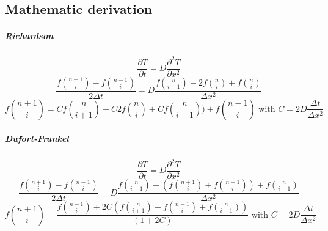 \documentclass[12pt, a4paper]{report}
\begin{document}
\begin{appendix}
\clearpage
{}
\chapter{Mathematic derivation}
\paragraph{Richardson}
\begin{equation}\frac{\partial T}{\partial t} = D\frac{\partial^2T }{\partial x^2}
\end{equation} 
\begin{equation}\frac{f\binom{n+1}{i} - f\binom{n-1}{i}}{2\Delta t} = D\frac{f\binom{n}{i+1} - 2f\binom{n}{i}+ f\binom{n}{i}}{\Delta x^{2}}
\end{equation} 
\begin{equation}f\binom{n+1}{i} = Cf\binom{n}{i+1} - C2f\binom{n}{i}+ Cf\binom{n}{i-1})+f\binom{n-1}{i} \text{ with }
C = 2D\frac{\Delta t}{\Delta x^{2}}
\end{equation} 
\paragraph{Dufort-Frankel}
\begin{equation}\frac{\partial T}{\partial t} = D\frac{\partial^2T }{\partial x^2}
\end{equation} 
\begin{equation}\frac{f\binom{n+1}{i} - f\binom{n-1}{i}}{2\Delta t} = D\frac{f\binom{n}{i+1} - (f\binom{n+1}{i}+f\binom{n-1}{i})+f\binom{n}{i-1}}{\Delta x^{2}}
\end{equation} 
\begin{equation}
f\binom{n+1}{i} = \frac{f\binom{n-1}{i}+2C(f\binom{n}{i+1}-f\binom{n-1}{i}+f\binom{n}{i-1})}{(1+2C)}\text{ with }
C = 2D\frac{\Delta t}{\Delta x^{2}}
\end{equation} 

\end{appendix}
\end{document}
